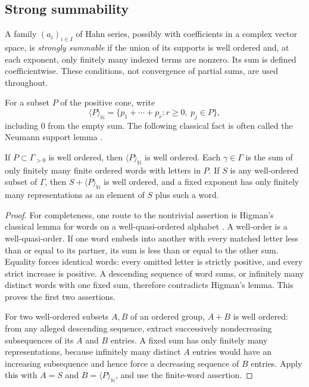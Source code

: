 \documentclass[11pt,letterpaper]{article}
\theoremstyle{definition}
\theoremstyle{remark}
\newcommand{\N}{\mathbb N}\newcommand{\Z}{\mathbb Z}\newcommand{\Q}{\mathbb Q}
\newcommand{\powers}[1]{\langle #1\rangle_{\N}}
\numberwithin{equation}{section}
\begin{document}
\subsection{Strong summability}
\begin{definition}
A family $(a_i)_{i\in I}$ of Hahn series, possibly with coefficients in a
complex vector space, is \emph{strongly summable} if the union of its supports
is well ordered and, at each exponent, only finitely many indexed terms are
nonzero. Its sum is defined coefficientwise. These conditions, not convergence
of partial sums, are used throughout.
\end{definition}

For a subset $P$ of the positive cone, write
\[
 \powers P=\{p_1+\cdots+p_r:r\geq0,\ p_j\in P\},
\]
including $0$ from the empty sum. The following classical fact is often called
the Neumann support lemma \cite{Neumann}.

\begin{lemma}\label{lem:neumann}
If $P\subset\Gamma_{>0}$ is well ordered, then $\powers P$ is well ordered.
Each $\gamma\in\Gamma$ is the sum of only finitely many finite ordered words
with letters in $P$. If $S$ is any well-ordered subset of $\Gamma$, then
$S+\powers P$ is well ordered, and a fixed exponent has only finitely many
representations as an element of $S$ plus such a word.
\end{lemma}
\begin{proof}
For completeness, one route to the nontrivial assertion is Higman's classical
lemma for words on a well-quasi-ordered alphabet \cite{Higman}. A well-order is
a well-quasi-order. If one word embeds into another with every matched letter
less than or equal to its partner, its sum is less than or equal to the other
sum. Equality forces identical words: every omitted letter is strictly
positive, and every strict increase is positive. A descending sequence of word
sums, or infinitely many distinct words with one fixed sum, therefore
contradicts Higman's lemma. This proves the first two assertions.

For two well-ordered subsets $A,B$ of an ordered group, $A+B$ is well ordered:
from any alleged descending sequence, extract successively nondecreasing
subsequences of its $A$ and $B$ entries. A fixed sum has only finitely many
representations, because infinitely many distinct $A$ entries would have an
increasing subsequence and hence force a decreasing sequence of $B$ entries.
Apply this with $A=S$ and $B=\powers P$, and use the finite-word assertion.
\end{proof}
\end{document}
